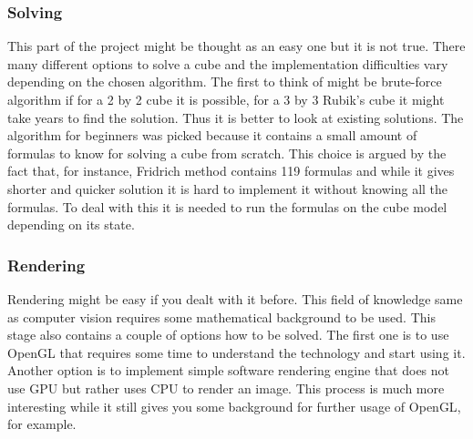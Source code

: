 \documentclass[../../main.tex]{subfiles}
\begin{document}
\subsubsection*{Solving}

This part of the project might be thought as an easy one but it is not true. There many different options to solve a cube and the implementation difficulties vary depending on the chosen algorithm. The first to think of might be brute-force algorithm if for a 2 by 2 cube it is possible, for a 3 by 3 Rubik's cube it might take years to find the solution. Thus it is better to look at existing solutions. The algorithm for beginners was picked because it contains a small amount of formulas to know for solving a cube from scratch. This choice is argued by the fact that, for instance, Fridrich method contains 119 formulas and while it gives shorter and quicker solution it is hard to implement it without knowing all the formulas. To deal with this it is needed to run the formulas on the cube model depending on its state.

\subsubsection*{Rendering}
\label{subsec:rendering}

Rendering might be easy if you dealt with it before. This field of knowledge same as computer vision requires some mathematical background to be used. This stage also contains a couple of options how to be solved. The first one is to use \ac{OpenGL} that requires some time to understand the technology and start using it. Another option is to implement simple software rendering engine that does not use \ac{GPU} but rather uses \ac{CPU} to render an image. This process is much more interesting while it still gives you some background for further usage of \ac{OpenGL}, for example.
\end{document}
